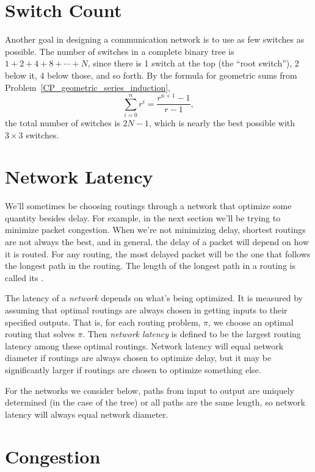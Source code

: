 \section{Switch Count}

Another goal in designing a communication network is to use as few
switches as possible.  The number of switches in a complete binary
tree is $1 + 2 + 4 + 8 + \cdots + N$, since there is 1 switch at the
top (the ``root switch''), 2 below it, 4 below those, and so forth.
By the formula for geometric sums from Problem~\ref{CP_geometric_series_induction},
\[
\sum_{i=0}^n r^i = \frac{r^{n+1}-1}{r-1},
\]
the total number of switches is $2 N - 1$, which is nearly the best
possible with $3 \times 3$ switches.

\section{Network Latency}

We'll sometimes be choosing routings through a network that optimize some
quantity besides delay.  For example, in the next section we'll be trying
to minimize packet congestion.  When we're not minimizing delay, shortest
routings are not always the best, and in general, the delay of a packet
will depend on how it is routed.  For any routing, the most delayed packet
will be the one that follows the longest path in the routing.  The length
of the longest path in a routing is called its .


The latency of a \emph{network} depends on what's being optimized.  It is
measured by assuming that optimal routings are always chosen in getting
inputs to their specified outputs.  That is, for each routing problem,
$\pi$, we choose an optimal routing that solves $\pi$.  Then \emph{network
  latency} is defined to be the largest routing latency among these
optimal routings.  Network latency will equal network diameter if routings
are always chosen to optimize delay, but it may be significantly larger if
routings are chosen to optimize something else.

For the networks we consider below, paths from input to output are
uniquely determined (in the case of the tree) or all paths are the same
length, so network latency will always equal network diameter.


\section{Congestion}

